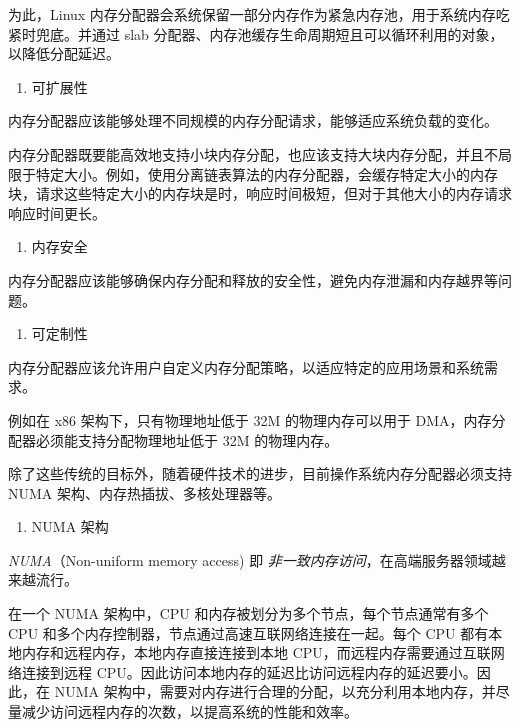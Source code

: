 \documentclass[AutoFakeBold]{LZUThesis}
\newcommand{\tightlist}{%
  \setlength{\itemsep}{0pt}\setlength{\parskip}{0pt}}
\begin{document}
\begin{sloppypar}
为此，Linux
内存分配器会系统保留一部分内存作为紧急内存池，用于系统内存吃紧时兜底。并通过
slab 分配器、内存池缓存生命周期短且可以循环利用的对象，以降低分配延迟。

\begin{enumerate}
\def\labelenumi{\arabic{enumi}.}
\setcounter{enumi}{2}
\tightlist
\item
  可扩展性
\end{enumerate}

内存分配器应该能够处理不同规模的内存分配请求，能够适应系统负载的变化。

内存分配器既要能高效地支持小块内存分配，也应该支持大块内存分配，并且不局限于特定大小。例如，使用分离链表算法的内存分配器，会缓存特定大小的内存块，请求这些特定大小的内存块是时，响应时间极短，但对于其他大小的内存请求响应时间更长。

\begin{enumerate}
\def\labelenumi{\arabic{enumi}.}
\setcounter{enumi}{3}
\tightlist
\item
  内存安全
\end{enumerate}

内存分配器应该能够确保内存分配和释放的安全性，避免内存泄漏和内存越界等问题。

\begin{enumerate}
\def\labelenumi{\arabic{enumi}.}
\setcounter{enumi}{4}
\tightlist
\item
  可定制性
\end{enumerate}

内存分配器应该允许用户自定义内存分配策略，以适应特定的应用场景和系统需求。

例如在 x86 架构下，只有物理地址低于 32M 的物理内存可以用于
DMA，内存分配器必须能支持分配物理地址低于 32M 的物理内存。

除了这些传统的目标外，随着硬件技术的进步，目前操作系统内存分配器必须支持
NUMA 架构、内存热插拔、多核处理器等。

\begin{enumerate}
\def\labelenumi{\arabic{enumi}.}
\tightlist
\item
  NUMA 架构
\end{enumerate}

\emph{NUMA}（Non-uniform memory access) 即
\emph{非一致内存访问}，在高端服务器领域越来越流行。

在一个 NUMA 架构中，CPU 和内存被划分为多个节点，每个节点通常有多个 CPU
和多个内存控制器，节点通过高速互联网络连接在一起。每个 CPU
都有本地内存和远程内存，本地内存直接连接到本地
CPU，而远程内存需要通过互联网络连接到远程
CPU。因此访问本地内存的延迟比访问远程内存的延迟要小。因此，在 NUMA
架构中，需要对内存进行合理的分配，以充分利用本地内存，并尽量减少访问远程内存的次数，以提高系统的性能和效率。


\end{sloppypar}
\end{document}
